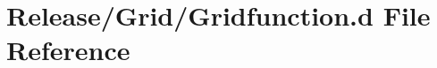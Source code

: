 \hypertarget{_release_2_grid_2_gridfunction_8d}{\section{Release/\-Grid/\-Gridfunction.d File Reference}
\label{d9/ddb/_release_2_grid_2_gridfunction_8d}
}
